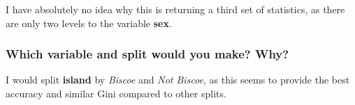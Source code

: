 \documentclass[
]{article}
\begin{document}
I have absolutely no idea why this is returning a third set of
statistics, as there are only two levels to the variable \textbf{sex}.

\subsubsection{Which variable and split would you make?
Why?}\label{which-variable-and-split-would-you-make-why}

I would split \textbf{island} by \emph{Biscoe} and \emph{Not Biscoe}, as
this seems to provide the best accuracy and similar Gini compared to
other splits.
\end{document}
